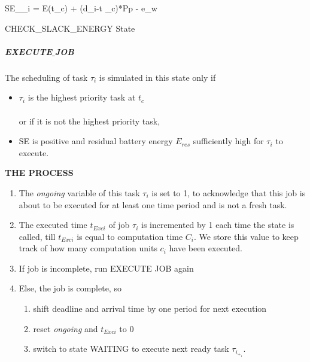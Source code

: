 \documentclass[12pt,hidelinks]{article}
\begin{document}
{\begin{algorithm}[H]
  
    
SE_{\tau_i} = E(t_c) + (d_i-t _c)*Pp - e_w
\caption{CHECK\_SLACK\_ENERGY State}
\end{algorithm} 

\newline

\subparagraph{EXECUTE$\_$JOB}\hfill
\newline

The scheduling of task $\tau_i$ is simulated in this state only if
\begin{itemize}
    \item $\tau_i$ is the highest priority task at $t_c$\\ \\
    or if it is not the highest priority task, 
    \item SE is positive and residual battery energy ${E_{res}}$ sufficiently high for $\tau_i$ to execute. 
\end{itemize}

\textbf{THE PROCESS}
\begin{enumerate}
    \item The \textit{ongoing} variable of this task $\tau_i$ is set to 1, to acknowledge that this job is about to be executed for at least one time period and is not a fresh task. 
    \item The executed time \textit{$t_{Exci}$} of job $\tau_i$ is incremented by 1 each time the state is called, till \textit{$t_{Exci}$} is equal to computation time $C_i$. We store this value to keep track of how many computation units \textit{$c_i$} have been executed.
    \item If job is incomplete, run EXECUTE JOB again
    \item Else, the job is complete, so
    \begin{enumerate}
        \item shift deadline and arrival time by one period for next execution
        \item reset \textit{ongoing} and \textit{$t_{Exci}$} to 0
        \item switch to state WAITING to execute next ready task $\tau_i_+_1$.
    \end{enumerate}
    

\end{enumerate}}
\end{document}
